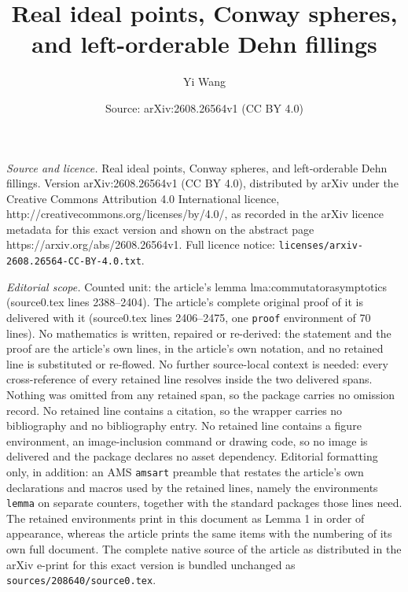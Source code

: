 \documentclass[10pt,a4paper]{amsart}
\title{Real ideal points, Conway spheres, and left-orderable Dehn fillings}
\author{Yi Wang}
\date{Source: arXiv:2608.26564v1 (CC BY 4.0)}
\begin{document}
\maketitle

\noindent\emph{Source and licence.} Real ideal points, Conway spheres, and left-orderable Dehn fillings. Version arXiv:2608.26564v1 (CC BY 4.0), distributed by arXiv under the Creative Commons Attribution 4.0 International licence, http://creativecommons.org/licenses/by/4.0/, as recorded in the arXiv licence metadata for this exact version and shown on the abstract page https://arxiv.org/abs/2608.26564v1. Full licence notice: \texttt{licenses/arxiv-2608.26564-CC-BY-4.0.txt}.\par\smallskip

\noindent\textit{Editorial scope.} Counted unit: the article's lemma lma:commutatorasymptotics (source0.tex lines 2388--2404). The article's complete original proof of it is delivered with it (source0.tex lines 2406--2475, one \texttt{proof} environment of 70 lines). No mathematics is written, repaired or re-derived: the statement and the proof are the article's own lines, in the article's own notation, and no retained line is substituted or re-flowed.  No further source-local context is needed: every cross-reference of every retained line resolves inside the two delivered spans.  Nothing was omitted from any retained span, so the package carries no omission record.  No retained line contains a citation, so the wrapper carries no bibliography and no bibliography entry.  No retained line contains a figure environment, an image-inclusion command or drawing code, so no image is delivered and the package declares no asset dependency.  Editorial formatting only, in addition: an AMS \texttt{amsart} preamble that restates the article's own declarations and macros used by the retained lines, namely the environments \texttt{lemma} on separate counters, together with the standard packages those lines need.  The retained environments print in this document as Lemma 1 in order of appearance, whereas the article prints the same items with the numbering of its own full document.  The complete native source of the article as distributed in the arXiv e-print for this exact version is bundled unchanged as \texttt{sources/208640/source0.tex}.
\end{document}
